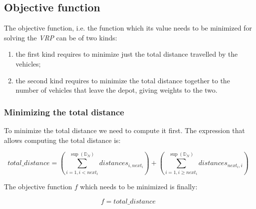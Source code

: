 \documentclass[../main.tex]{subfiles}
\begin{document}
\subsection{Objective function}
\label{subsec:objective-function}
The objective function, i.e. the function which its value needs to be minimized for solving the \textit{VRP} can be of two kinds:
\begin{enumerate}
    \item the first kind requires to minimize just the total distance travelled by the vehicles;
    \item the second kind requires to minimize the total distance together to the number of vehicles that leave the depot, giving weights to the two.
\end{enumerate}
\subsubsection{Minimizing the total distance}
\label{subsubsec:minimizing-total-distance}
To minimize the total distance we need to compute it first. The expression that allows computing the total distance is:
\begin{center}
    \begin{equation}
        total\_distance = (\sum_{i = 1, i < next_i}^{\sup{}(\mathbb{D}_N)}{distances_{i, next_i}}) + (\sum_{i = 1, i \geq next_i}^{\sup{}(\mathbb{D}_N)}{distances_{next_i, i}})
    \end{equation}
\end{center}
The objective function $f$ which needs to be minimized is finally:
\begin{center}
    \begin{equation}
        f = total\_distance
    \end{equation}
\end{center}
\end{document}
